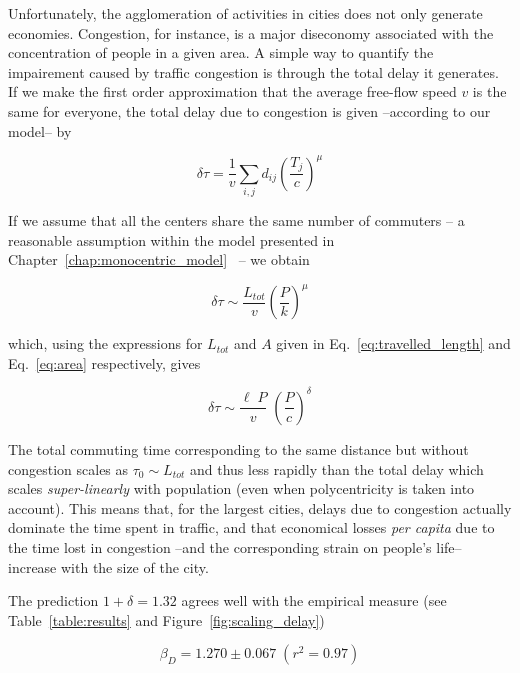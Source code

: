 Unfortunately, the agglomeration of activities in cities does not only generate economies.
Congestion, for instance, is a major diseconomy associated with the
concentration of people in a given area. A simple way to quantify the
impairement caused by traffic congestion is through the total delay it
generates. If we make the first order approximation that the average free-flow
speed $v$ is the same for everyone, the total delay due to congestion is given
--according to our model-- by

\begin{equation} 
    \delta \tau = \frac{1}{v} \sum_{i,j} d_{ij} \left(\frac{T_j}{c} \right)^\mu 
\end{equation}

If we assume that all the centers share the same number of commuters -- a
reasonable assumption within the model presented in
Chapter~\ref{chap:monocentric_model}~\cite{Louf:2013_polycentric} -- we obtain

\begin{equation} 
    \delta \tau \sim \frac{L_{tot}}{v} \left( \frac{P}{k}
\right)^{\mu} 
\end{equation} 

which, using the expressions for $L_{tot}$ and $A$
given in Eq.~\ref{eq:travelled_length} and Eq.~\ref{eq:area} respectively, gives

\begin{equation} 
    \delta \tau \sim \frac{\ell\; P}{v}\;\left(\frac{P}{c}\right)^{\delta} 
\end{equation}

The total commuting time corresponding to the same distance but without
congestion scales as $\tau_0\sim L_{tot}$ and thus less rapidly than the total
delay which scales \emph{super-linearly} with population (even when
polycentricity is taken into account). This means that, for the largest cities,
delays due to congestion actually dominate the time spent in traffic, and that
economical losses \emph{per capita} due to the time lost in congestion --and the
corresponding strain on people's life-- increase with the size of the city. 

The prediction $1+\delta = 1.32$ agrees well with the empirical measure (see
Table~\ref{table:results} and Figure~\ref{fig:scaling_delay})

\begin{equation}
    \boxed{\beta_D = 1.270 \pm 0.067\;(r^2 = 0.97)}
\end{equation}


